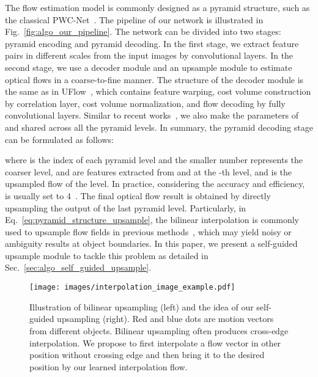 \documentclass[final]{cvpr}
\begin{document}
The flow estimation model  is commonly designed as a pyramid structure, such as the classical PWC-Net~\cite{pwc_net}. The pipeline of our network is illustrated in Fig.~\ref{fig:algo_our_pipeline}. 
The network can be divided into two stages: pyramid encoding and pyramid decoding. 
In the first stage, we extract feature pairs in different scales from the input images by convolutional layers. 
In the second stage, we use a decoder module  and an upsample module  to estimate optical flows in a coarse-to-fine manner. 
The structure of the decoder module  is the same as in UFlow~\cite{jonschkowski2020matters}, which contains feature warping, cost volume construction by correlation layer, cost volume normalization, and flow decoding by fully convolutional layers. Similar to recent works~\cite{irrpwc,jonschkowski2020matters}, we also make the parameters of  and  shared across all the pyramid levels. In summary, the pyramid decoding stage can be formulated as follows: 

where  is the index of each pyramid level and the smaller number represents the coarser level,  and  are features extracted from  and  at the -th level, and  is the upsampled flow of the  level. 
In practice, considering the accuracy and efficiency,  is usually set to 4~\cite{irrpwc,pwc_net}. The final optical flow result is obtained by directly upsampling the output of the last pyramid level. 
Particularly, in Eq.~\ref{eq:pyramid_structure_upsample}, the bilinear interpolation is commonly used to upsample flow fields in previous methods~\cite{irrpwc,jonschkowski2020matters}, which may yield noisy or ambiguity results at object boundaries. In this paper, we present a self-guided upsample module to tackle this problem as detailed in Sec.~\ref{sec:algo_self_guided_upsample}. 

\begin{figure}
	\centering
	\texttt{[image: images/interpolation\_image\_example.pdf]}
	\caption{
		Illustration of bilinear upsampling (left) and the idea of our self-guided upsampling (right). Red and blue dots are motion vectors from different objects.
		Bilinear upsampling often produces cross-edge interpolation. We propose to first interpolate a flow vector in other position without crossing edge and then bring it to the desired position by our learned interpolation flow. 
	}\label{fig:algo_self_guided_interpolation_}
\end{figure}
\end{document}
